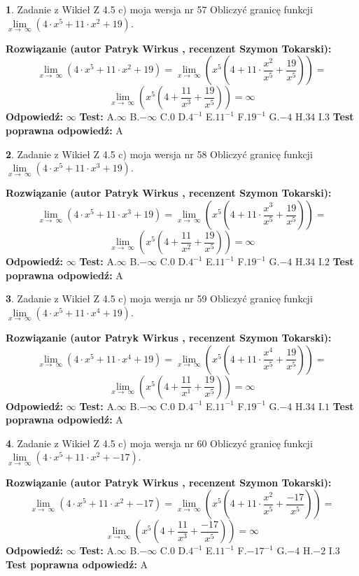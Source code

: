 \documentclass[12pt, a4paper]{article}
\theoremstyle{definition} %
\newtheorem{zad}{}
\newcommand{\zadStart}[1]{\begin{zad}#1\newline}
\newcommand{\zadStop}{\end{zad}}
\newcommand{\rozwStart}[2]{\noindent \textbf{Rozwiązanie (autor #1 , recenzent #2): }\newline}
\newcommand{\rozwStop}{\newline}
\newcommand{\odpStart}{\noindent \textbf{Odpowiedź:}\newline}
\newcommand{\odpStop}{\newline}
\newcommand{\testStart}{\noindent \textbf{Test:}\newline}
\newcommand{\testStop}{\newline}
\newcommand{\kluczStart}{\noindent \textbf{Test poprawna odpowiedź:}\newline}
\newcommand{\kluczStop}{\newline}
\begin{document}
\zadStart{Zadanie z Wikieł Z 4.5 c) moja wersja nr 57}
Obliczyć granicę funkcji  $\lim\limits_{x\to\ \infty}(4 \cdot x^{5}+11 \cdot x^{2}+19)$.
\zadStop
\rozwStart{Patryk Wirkus}{Szymon Tokarski}
$$\lim\limits_{x\to\ \infty}(4 \cdot x^{5}+11 \cdot x^{2}+19) = \lim\limits_{x\to\ \infty}(x^{5}(4 +11 \cdot \frac{x^{2}}{x^{5}}+\frac{19}{x^{5}})) =$$ $$\lim\limits_{x\to\ \infty}(x^{5}(4 +\frac{11}{x^{3}}+\frac{19}{x^{5}})) =\infty$$
\rozwStop
\odpStart
$\infty$
\odpStop
\testStart
A.$\infty$ B.$-\infty$ C.$0$ D.$4^{-1}$ E.$11^{-1}$
F.$19^{-1}$ G.$-4$
H.$34$
I.$3$
\testStop
\kluczStart
A
\kluczStop



\zadStart{Zadanie z Wikieł Z 4.5 c) moja wersja nr 58}
Obliczyć granicę funkcji  $\lim\limits_{x\to\ \infty}(4 \cdot x^{5}+11 \cdot x^{3}+19)$.
\zadStop
\rozwStart{Patryk Wirkus}{Szymon Tokarski}
$$\lim\limits_{x\to\ \infty}(4 \cdot x^{5}+11 \cdot x^{3}+19) = \lim\limits_{x\to\ \infty}(x^{5}(4 +11 \cdot \frac{x^{3}}{x^{5}}+\frac{19}{x^{5}})) =$$ $$\lim\limits_{x\to\ \infty}(x^{5}(4 +\frac{11}{x^{2}}+\frac{19}{x^{5}})) =\infty$$
\rozwStop
\odpStart
$\infty$
\odpStop
\testStart
A.$\infty$ B.$-\infty$ C.$0$ D.$4^{-1}$ E.$11^{-1}$
F.$19^{-1}$ G.$-4$
H.$34$
I.$2$
\testStop
\kluczStart
A
\kluczStop



\zadStart{Zadanie z Wikieł Z 4.5 c) moja wersja nr 59}
Obliczyć granicę funkcji  $\lim\limits_{x\to\ \infty}(4 \cdot x^{5}+11 \cdot x^{4}+19)$.
\zadStop
\rozwStart{Patryk Wirkus}{Szymon Tokarski}
$$\lim\limits_{x\to\ \infty}(4 \cdot x^{5}+11 \cdot x^{4}+19) = \lim\limits_{x\to\ \infty}(x^{5}(4 +11 \cdot \frac{x^{4}}{x^{5}}+\frac{19}{x^{5}})) =$$ $$\lim\limits_{x\to\ \infty}(x^{5}(4 +\frac{11}{x^{1}}+\frac{19}{x^{5}})) =\infty$$
\rozwStop
\odpStart
$\infty$
\odpStop
\testStart
A.$\infty$ B.$-\infty$ C.$0$ D.$4^{-1}$ E.$11^{-1}$
F.$19^{-1}$ G.$-4$
H.$34$
I.$1$
\testStop
\kluczStart
A
\kluczStop



\zadStart{Zadanie z Wikieł Z 4.5 c) moja wersja nr 60}
Obliczyć granicę funkcji  $\lim\limits_{x\to\ \infty}(4 \cdot x^{5}+11 \cdot x^{2}+-17)$.
\zadStop
\rozwStart{Patryk Wirkus}{Szymon Tokarski}
$$\lim\limits_{x\to\ \infty}(4 \cdot x^{5}+11 \cdot x^{2}+-17) = \lim\limits_{x\to\ \infty}(x^{5}(4 +11 \cdot \frac{x^{2}}{x^{5}}+\frac{-17}{x^{5}})) =$$ $$\lim\limits_{x\to\ \infty}(x^{5}(4 +\frac{11}{x^{3}}+\frac{-17}{x^{5}})) =\infty$$
\rozwStop
\odpStart
$\infty$
\odpStop
\testStart
A.$\infty$ B.$-\infty$ C.$0$ D.$4^{-1}$ E.$11^{-1}$
F.$-17^{-1}$ G.$-4$
H.$-2$
I.$3$
\testStop
\kluczStart
A
\kluczStop
\end{document}
